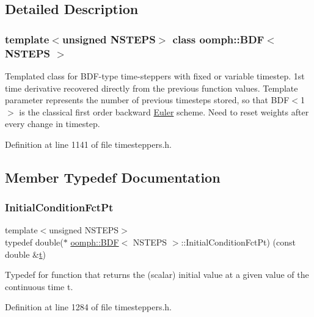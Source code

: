\subsection{Detailed Description}
\subsubsection*{template$<$unsigned N\+S\+T\+E\+PS$>$\newline
class oomph\+::\+B\+D\+F$<$ N\+S\+T\+E\+P\+S $>$}

Templated class for B\+D\+F-\/type time-\/steppers with fixed or variable timestep. 1st time derivative recovered directly from the previous function values. Template parameter represents the number of previous timesteps stored, so that B\+D\+F$<$1$>$ is the classical first order backward \hyperlink{classoomph_1_1Euler}{Euler} scheme. Need to reset weights after every change in timestep. 

Definition at line 1141 of file timesteppers.\+h.



\subsection{Member Typedef Documentation}
\mbox{\label{classoomph_1_1BDF_a7b4271c53928ee107dc9b5ab218bfe74}} 
\subsubsection{\texorpdfstring{Initial\+Condition\+Fct\+Pt}{InitialConditionFctPt}}
{\footnotesize\ttfamily template$<$unsigned N\+S\+T\+E\+PS$>$ \\
typedef double($\ast$ \hyperlink{classoomph_1_1BDF}{oomph\+::\+B\+DF}$<$ N\+S\+T\+E\+PS $>$\+::Initial\+Condition\+Fct\+Pt) (const double \&\hyperlink{cfortran_8h_af6f0bd3dc13317f895c91323c25c2b8f}{t})}



Typedef for function that returns the (scalar) initial value at a given value of the continuous time t. 



Definition at line 1284 of file timesteppers.\+h.



